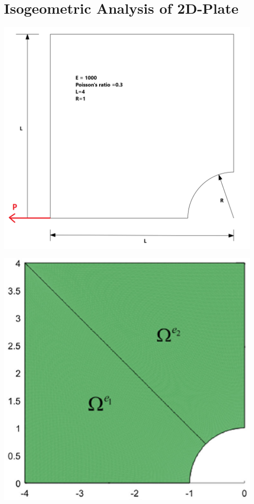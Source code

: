 \documentclass{beamer}
\begin{document}
\section{Isogeometric Analysis of 2D-Plate}
\begin{minipage}[b]{0.48\linewidth}
    \includegraphics[width=1.0\textwidth,height=0.6\textheight]{figures/plate2.png} \\
    \centering \label{Underformed Plate}
  \end{minipage}
  \begin{minipage}[b]{0.48\linewidth}
    \includegraphics[width=1.0\textwidth,height=0.6\textheight]{figures/plate_elems.PNG} \\
    \centering \label{Deformed Plate}
  \end{minipage}
\end{document}
